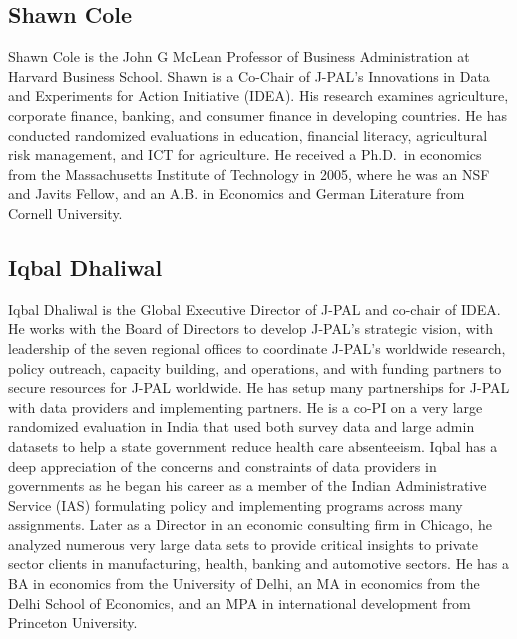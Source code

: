 \documentclass[
]{book}
\begin{document}
\hypertarget{shawn-cole}{%
\subsection*{Shawn Cole}\label{shawn-cole}}

Shawn Cole is the John G McLean Professor of Business Administration at Harvard Business School. Shawn is a Co-Chair of J-PAL's Innovations in Data and Experiments for Action Initiative (IDEA). His research examines agriculture, corporate finance, banking, and consumer finance in developing countries. He has conducted randomized evaluations in education, financial literacy, agricultural risk management, and ICT for agriculture. He received a Ph.D.~in economics from the Massachusetts Institute of Technology in 2005, where he was an NSF and Javits Fellow, and an A.B. in Economics and German Literature from Cornell University.

\hypertarget{iqbal-dhaliwal}{%
\subsection*{Iqbal Dhaliwal}\label{iqbal-dhaliwal}}

Iqbal Dhaliwal is the Global Executive Director of J-PAL and co-chair of IDEA. He works with the Board of Directors to develop J-PAL's strategic vision, with leadership of the seven regional offices to coordinate J-PAL's worldwide research, policy outreach, capacity building, and operations, and with funding partners to secure resources for J-PAL worldwide. He has setup many partnerships for J-PAL with data providers and implementing partners. He is a co-PI on a very large randomized evaluation in India that used both survey data and large admin datasets to help a state government reduce health care absenteeism. Iqbal has a deep appreciation of the concerns and constraints of data providers in governments as he began his career as a member of the Indian Administrative Service (IAS) formulating policy and implementing programs across many assignments. Later as a Director in an economic consulting firm in Chicago, he analyzed numerous very large data sets to provide critical insights to private sector clients in manufacturing, health, banking and automotive sectors. He has a BA in economics from the University of Delhi, an MA in economics from the Delhi School of Economics, and an MPA in international development from Princeton University.
\end{document}

